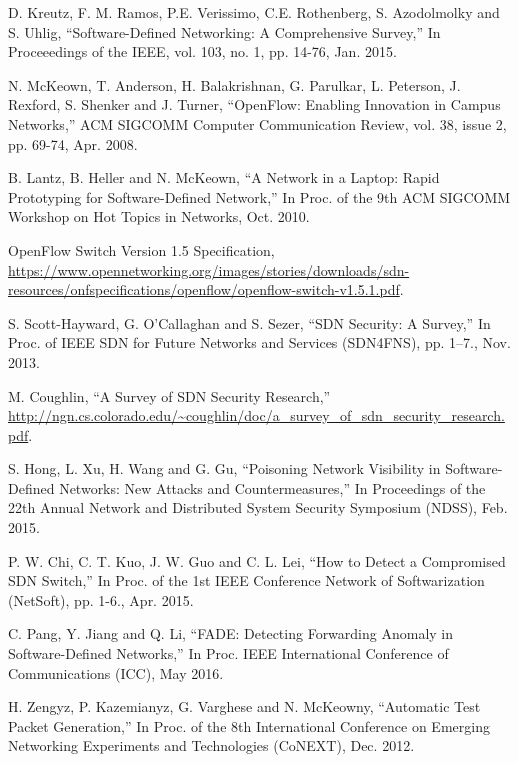 \begin{thebibliography}{1}

D. Kreutz, F. M. Ramos, P.E. Verissimo, C.E. Rothenberg, S. Azodolmolky and S. Uhlig,
``Software-Defined Networking: A Comprehensive Survey,'' In Proceeedings of the IEEE, vol. 103, no. 1, pp.  14-76, Jan. 2015.

N. McKeown, T. Anderson, H. Balakrishnan, G. Parulkar, L. Peterson, J. Rexford, S. Shenker and J. Turner,
``OpenFlow: Enabling Innovation in Campus Networks,'' ACM SIGCOMM Computer Communication Review, vol. 38, issue 2, pp. 69-74, Apr. 2008.

B. Lantz, B. Heller and N. McKeown,
``A Network in a Laptop: Rapid Prototyping for Software-Defined Network,'' In Proc. of the 9th ACM SIGCOMM Workshop on Hot Topics in Networks, Oct. 2010.

OpenFlow Switch Version 1.5 Specification, \url{https://www.opennetworking.org/images/stories/downloads/sdn-resources/onfspecifications/openflow/openflow-switch-v1.5.1.pdf}.

S. Scott-Hayward, G. O’Callaghan and S. Sezer,
``SDN Security: A Survey,'' In Proc. of IEEE SDN for Future Networks and Services (SDN4FNS), pp. 1–7., Nov. 2013.

M. Coughlin,
``A Survey of SDN Security Research,'' \url{http://ngn.cs.colorado.edu/~coughlin/doc/a_survey_of_sdn_security_research.pdf}.

S. Hong, L. Xu, H. Wang and G. Gu,
``Poisoning Network Visibility in Software-Defined Networks: New Attacks and Countermeasures,''  In Proceedings of the 22th Annual Network and Distributed System Security Symposium (NDSS), Feb. 2015.

P. W. Chi, C. T. Kuo, J. W. Guo and C. L. Lei,
``How to Detect a Compromised SDN Switch,'' In Proc. of the 1st IEEE Conference Network of Softwarization (NetSoft), pp. 1-6., Apr. 2015.

C. Pang, Y. Jiang and Q. Li,
``FADE: Detecting Forwarding Anomaly in Software-Defined Networks,'' In Proc. IEEE International Conference of Communications (ICC), May 2016.

H. Zengyz, P. Kazemianyz, G. Varghese and N. McKeowny,
``Automatic Test Packet Generation,'' In Proc. of the 8th International Conference on Emerging Networking Experiments and Technologies (CoNEXT), Dec. 2012.


\end{thebibliography}
